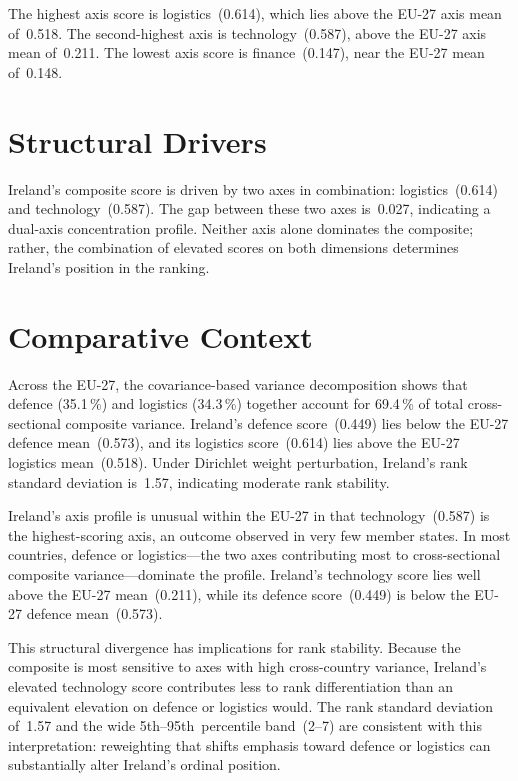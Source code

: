 \documentclass[12pt,a4paper]{article}
\begin{document}
The highest axis score is logistics~(0.614), which lies above the EU-27 axis mean of~0.518.  The second-highest axis is technology~(0.587), above the EU-27 axis mean of~0.211.  The lowest axis score is finance~(0.147), near the EU-27 mean of~0.148.


\section{Structural Drivers}
\label{sec:drivers}

\begin{sloppypar}
Ireland's composite score is driven by two axes in combination: logistics~(0.614) and technology~(0.587).  The gap between these two axes is~0.027, indicating a dual-axis concentration profile.  Neither axis alone dominates the composite; rather, the combination of elevated scores on both dimensions determines Ireland's position in the ranking.
\end{sloppypar}


\section{Comparative Context}
\label{sec:comparative}

Across the EU-27, the covariance-based variance decomposition shows that defence (35.1\,\%) and logistics (34.3\,\%) together account for 69.4\,\% of total cross-sectional composite variance.  Ireland's defence score~(0.449) lies below the EU-27 defence mean~(0.573), and its logistics score~(0.614) lies above the EU-27 logistics mean~(0.518).  Under Dirichlet weight perturbation, Ireland's rank standard deviation is~1.57, indicating moderate rank stability.



Ireland's axis profile is unusual within the EU-27 in that technology~(0.587) is the highest-scoring axis, an outcome observed in very few member states.  In most countries, defence or logistics---the two axes contributing most to cross-sectional composite variance---dominate the profile.  Ireland's technology score lies well above the EU-27 mean~(0.211), while its defence score~(0.449) is below the EU-27 defence mean~(0.573).

This structural divergence has implications for rank stability.  Because the composite is most sensitive to axes with high cross-country variance, Ireland's elevated technology score contributes less to rank differentiation than an equivalent elevation on defence or logistics would.  The rank standard deviation of~1.57 and the wide 5th--95th~percentile band~(2--7) are consistent with this interpretation: reweighting that shifts emphasis toward defence or logistics can substantially alter Ireland's ordinal position.
\end{document}
